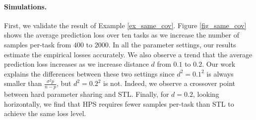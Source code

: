 {\paragraph{Simulations.}
First, we validate the result of Example \ref{ex_same_cov}.
Figure \ref{fig_same_cov} shows the average prediction loss over ten tasks as we increase the number of samples per-task from $400$ to $2000$.
In all the parameter settings, our results estimate the empirical losses accurately.
We also observe a trend that the average prediction loss increases as we increase distance $d$ from $0.1$ to $0.2$.
Our work explains the differences between these two settings since $d^2 = 0.1^2$ is always smaller than $\frac{\sigma^2 p}{n - p}$, but $d^2 = 0.2^2$ is not.
Indeed, we observe a crossover point between hard parameter sharing and STL.
Finally, for $d = 0.2$, looking horizontally, we find that HPS requires fewer samples per-task than STL to achieve the same loss level. %







}
